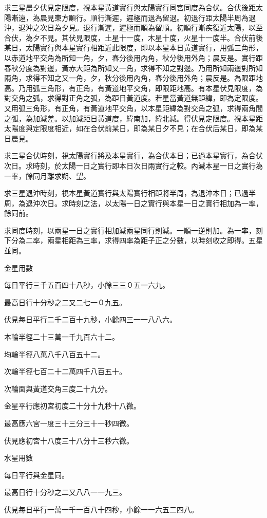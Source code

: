 \begin{pinyinscope}
求三星晨夕伏見定限度，視本星黃道實行與太陽實行同宮同度為合伏。合伏後距太陽漸遠，為晨見東方順行。順行漸遲，遲極而退為留退。初退行距太陽半周為退沖，退沖之次日為夕見。退行漸遲，遲極而順為留順。初順行漸疾復近太陽，以至合伏，為夕不見。其伏見限度，土星十一度，木星十度，火星十一度半。合伏前後某日，太陽實行與本星實行相距近此限度，即以本星本日黃道實行，用弧三角形，以赤道地平交角為所知一角，夕，春分後用內角，秋分後用外角；晨反是。實行距春秋分度為對邊，黃赤大距為所知又一角，求得不知之對邊。乃用所知兩邊對所知兩角，求得不知之又一角，夕，秋分後用內角，春分後用外角；晨反是。為限距地高。乃用弧三角形，有正角，有黃道地平交角，即限距地高。有本星伏見限度，為對交角之弧，求得對正角之弧，為距日黃道度。若星當黃道無距緯，即為定限度。又用弧三角形，有正角，有黃道地平交角，以本星距緯為對交角之弧，求得兩角間之弧，為加減差。以加減距日黃道度，緯南加，緯北減。得伏見定限度。視本星距太陽度與定限度相近，如在合伏前某日，即為某日夕不見；在合伏后某日，即為某日晨見。

求三星合伏時刻，視太陽實行將及本星實行，為合伏本日；已過本星實行，為合伏次日。求時刻，於太陽一日之實行即本日次日兩實行之較。內減本星一日之實行為一率，餘同月離求朔、望。

求三星退沖時刻，視本星黃道實行與太陽實行相距將半周，為退沖本日；已過半周，為退沖次日。求時刻之法，以太陽一日之實行與本星一日之實行相加為一率，餘同前。

求同度時刻，以兩星一日之實行相加減兩星同行則減。一順一逆則加。為一率，刻下分為二率，兩星相距為三率，求得四率為距子正之分數，以時刻收之即得。五星並同。

金星用數

每日平行三千五百四十八秒，小餘三三０五一六九。

最高日行十分秒之二又二七一０九五。

伏見每日平行二千二百十九秒，小餘四三一一八八六。

本輪半徑二十三萬一千九百六十二。

均輪半徑八萬八千八百五十二。

次輪半徑七百二十二萬四千八百五十。

次輪面與黃道交角三度二十九分。

金星平行應初宮初度二十分十九秒十八微。

最高應六宮一度三十三分三十一秒四微。

伏見應初宮十八度三十八分十三秒六微。

水星用數

每日平行與金星同。

最高日行十分秒之二又八八一一九三。

伏見每日平行一萬一千一百八十四秒，小餘一一六五二四八。


\end{pinyinscope}
